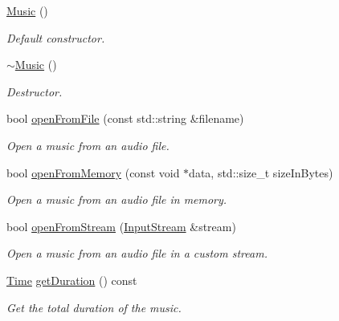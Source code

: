 \begin{DoxyCompactItemize}
\item 
\hypertarget{classsf_1_1_music_a0bc787d8e022b3a9b89cf2c28befd42e}{\hyperlink{classsf_1_1_music_a0bc787d8e022b3a9b89cf2c28befd42e}{Music} ()}\label{classsf_1_1_music_a0bc787d8e022b3a9b89cf2c28befd42e}

\begin{DoxyCompactList}\small\item\em Default constructor. \end{DoxyCompactList}\item 
\hypertarget{classsf_1_1_music_a4c65860fed2f01d0eaa6c4199870414b}{\hyperlink{classsf_1_1_music_a4c65860fed2f01d0eaa6c4199870414b}{$\sim$\+Music} ()}\label{classsf_1_1_music_a4c65860fed2f01d0eaa6c4199870414b}

\begin{DoxyCompactList}\small\item\em Destructor. \end{DoxyCompactList}\item 
bool \hyperlink{classsf_1_1_music_a3edc66e5f5b3f11e84b90eaec9c7d7c0}{open\+From\+File} (const std\+::string \&filename)
\begin{DoxyCompactList}\small\item\em Open a music from an audio file. \end{DoxyCompactList}\item 
bool \hyperlink{classsf_1_1_music_ae93b21bcf28ff0b5fec458039111386e}{open\+From\+Memory} (const void $\ast$data, std\+::size\+\_\+t size\+In\+Bytes)
\begin{DoxyCompactList}\small\item\em Open a music from an audio file in memory. \end{DoxyCompactList}\item 
bool \hyperlink{classsf_1_1_music_a4e55d1910a26858b44778c26b237d673}{open\+From\+Stream} (\hyperlink{classsf_1_1_input_stream}{Input\+Stream} \&stream)
\begin{DoxyCompactList}\small\item\em Open a music from an audio file in a custom stream. \end{DoxyCompactList}\item 
\hyperlink{classsf_1_1_time}{Time} \hyperlink{classsf_1_1_music_af4738b69c4c5038f71414ad7ffbbdc2b}{get\+Duration} () const 
\begin{DoxyCompactList}\small\item\em Get the total duration of the music. \end{DoxyCompactList}\end{DoxyCompactItemize}

